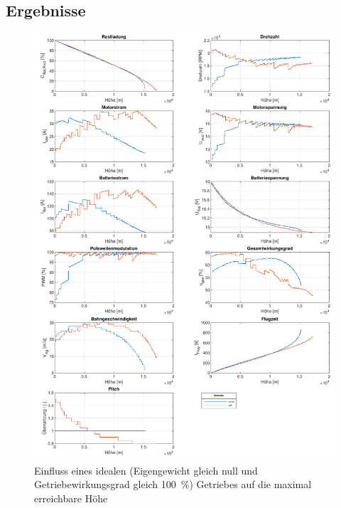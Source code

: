 

\subsection{Ergebnisse}
\begin{figure}[H]
\centering
	\includegraphics[scale=0.7]{Diagramme/Getriebe.pdf}
	\caption{Einfluss eines idealen (Eigengewicht gleich null und Getriebewirkungsgrad gleich \SI{100}{\%}) Getriebes auf die maximal erreichbare Höhe}
	\label{abb:getriebe}
\end{figure}

